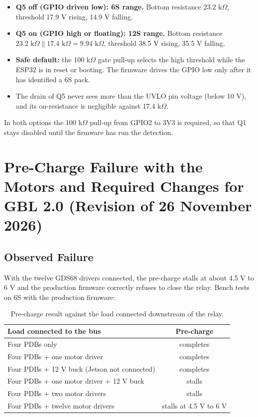 \documentclass[11pt,a4paper]{article}
\begin{document}
\begin{itemize}
    \item \textbf{Q5 off (GPIO driven low): 6S range.} Bottom resistance 23.2 k$\Omega$, threshold 17.9 V rising, 14.9 V falling.
    \item \textbf{Q5 on (GPIO high or floating): 12S range.} Bottom resistance $23.2 \text{ k}\Omega \parallel 17.4 \text{ k}\Omega = 9.94 \text{ k}\Omega$, threshold 38.5 V rising, 35.5 V falling.
    \item \textbf{Safe default:} the 100 k$\Omega$ gate pull-up selects the high threshold while the ESP32 is in reset or booting. The firmware drives the GPIO low only after it has identified a 6S pack.
    \item The drain of Q5 never sees more than the UVLO pin voltage (below 10 V), and its on-resistance is negligible against 17.4 k$\Omega$.
\end{itemize}

In both options the 100 k$\Omega$ pull-up from GPIO2 to 3V3 is required, so that Q1 stays disabled until the firmware has run the detection.

\section{Pre-Charge Failure with the Motors and Required Changes for GBL 2.0 (Revision of 26 November 2026)}
\label{sec:gbl2}

\subsection{Observed Failure}

With the twelve GDS68 drivers connected, the pre-charge stalls at about 4.5 V to 6 V and the production firmware correctly refuses to close the relay. Bench tests on 6S with the production firmware:

\begin{table}[H]
\centering
\begin{tabular}{lc}
\toprule
Load connected to the bus & Pre-charge \\
\midrule
Four PDBs only & completes \\
Four PDBs + one motor driver & completes \\
Four PDBs + 12 V buck (Jetson not connected) & completes \\
Four PDBs + one motor driver + 12 V buck & stalls \\
Four PDBs + two motor drivers & stalls \\
Four PDBs + twelve motor drivers & stalls at 4.5 V to 6 V \\
\bottomrule
\end{tabular}
\caption{Pre-charge result against the load connected downstream of the relay.}
\end{table}
\end{document}
